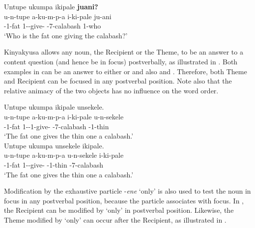 \documentclass[output=paper]{langscibook}
\begin{document}
\ex
\label{ex:postv-qrecipient:b}
{Untupe} {ukumpa} {ikipale} \textbf{juani?}\\
\gll
{u-n-tupe}  {a-ku-m-p-a}  {i-ki-pale}  ju-ani\\
{\AUG{}-1-fat}  {1\SM-\OM{}-give-\FV{}}  {\AUG{}-7-calabash}  {1-who}\\
\glt
‘Who is the fat one giving the calabash?’\\

\z
\z


Kinyakyusa allows any noun, the Recipient or the Theme, to be an answer to a content question (and hence be in focus) postverbally, as illustrated in . Both examples in  can be an answer to either  or  and also  and . Therefore, both Theme and Recipient can be focused in any postverbal position. Note also that the relative animacy of the two objects has no influence on the word order.

\ea
\label{bkm:Ref90047925}
\ea
Untupe ukumpa ikipale unsekele.\\
\gll
u-n-tupe  a-ku-m-p-a  i-ki-pale  u-n-sekele\\
\AUG{}-1-fat  1\SM{}-\PRS{}-1\OM{}-give-\FV{}  \AUG{}-7-calabash  \AUG{}-1-thin\\
\glt
‘The fat one gives the thin one a calabash.’\\

\ex
{Untupe} {ukumpa} {unsekele} {ikipale}.\\
\gll
{u-n-tupe}  {a-ku-m-p-a}  {u-n-sekele}  {i-ki-pale}\\
{\AUG{}-1-fat}  {1\SM-\OM{}-give-\FV{}}  {\AUG{}-1-thin}  {\AUG{}-7-calabash}\\
\glt
‘The fat one gives the thin one a calabash.’\\

\z\z


Modification by the exhaustive particle  -\textit{ene} ‘only’ is also used to test the noun in focus in any postverbal position, because the particle associates with focus. In , the Recipient can be modified by ‘only’ in postverbal position. Likewise, the Theme modified by ‘only’ can occur after the Recipient, as illustrated in .
\end{document}

